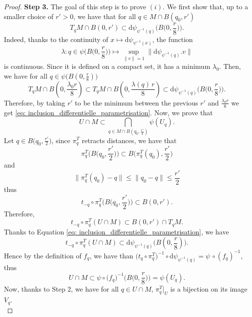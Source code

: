 \documentclass[10pt,a4paper]{amsart}
\renewcommand{\d}{\mathrm{d}}
\renewcommand{\leq}{\leqslant}
\begin{document}
\begin{proof}
    \noindent \textbf{Step 3.} The goal of this step is to prove $(i)$.
    We first show that, up to a smaller choice of $r'>0$, we have that for all $q \in M \cap B(q_0,r')$
    \begin{equation} \label{eq: inclusion_differentielle_parametrisation}
        T_{q} M \cap B(0,r') \subset  \d \psi_{\psi^{-1}(q)} \Big( B\big(0,\frac{r}{8}\big) \Big).
    \end{equation}
    Indeed, thanks to the continuity of $x \mapsto  \d \psi_{\psi^{-1}(x)}$, the function
    \[ \lambda : q \in  \psi\big(B\big(0,\frac{r}{8}\big)\big) \mapsto \underset{\|v\| = 1}{\sup} \|  \d \psi_{\psi^{-1}(q)} .v  \|\]
    is continuous. 
    Since it is defined on a compact set, it has a minimum $\lambda_0$.
    Then, we have for all $q \in \psi\big(B (0,\frac{r}{8})\big)$
    \[   T_{q} M \cap B(0,\frac{\lambda_0 r }{8}) \subset  T_{q} M \cap B(0,\frac{\lambda(q) \, r }{8}) \subset \d \psi_{\psi^{-1}(q)} \Big( B\big(0,\frac{r}{8}\big) \Big).\]
    Therefore, by taking $r'$ to be the minimum between the previous $r'$ and $\frac{\lambda_0 r }{8}$ we get \eqref{eq: inclusion_differentielle_parametrisation}.
    Now, we prove that
    \[ U \cap M \subset \underset{q \in  M \cap B(q_0,\frac{r'}{4})}{\bigcap} \psi(U_{q}).\]
    Let $q \in B\big(q_0, \frac{r'}{2}\big)$, since $\pi_q^T$ retracts distances, we have that
    $$  \pi^T_{q} \Big(  B\Big(q_0, \frac{r'}{2}\Big) \Big) \subset  B\Big( \pi_q^T(q_0), \frac{r'}{2}\Big)$$
    and
    $$ \| \pi_q^T (q_0) - q \| \leq \| q_0 - q \| \leq \frac{r'}{2} $$
    thus
    $$   t_{-q} \circ \pi^T_{q} \Big(  B\Big(q_0, \frac{r'}{2}\Big) \Big) \subset  B( 0 , r').$$
    Therefore,
    $$   t_{-q} \circ \pi^T_{q} ( U \cap M )  \subset B(0 , r') \cap T_q M.$$
    Thanks to Equation \eqref{eq: inclusion_differentielle_parametrisation}, we have
    \[   t_{-q} \circ \pi^T_{q} (U \cap M)  \subset \d \psi_{\psi^{-1}(q)} \big( B(0,\frac{r}{8}) \big) .\]
    Hence by the definition of $f_q$, we have than $ \big( t_q \circ \pi_q^T) ^{-1} \circ \d \psi_{\psi^{-1}(q)} = \psi \, \circ (f_q)^{-1}$, thus
    \[U \cap M \subset \psi \circ \big( f_{q} \big)^{-1} \Big( B\big(0,\frac{r}{8}\big) \Big)  = \psi (U_{q}).\]
    Now, thanks to Step 2, we have for all $q \in U \cap M$, $\pi_{q}^T |_U$ is a bijection on its image $V_{q}$. \\


\end{proof}
\end{document}
